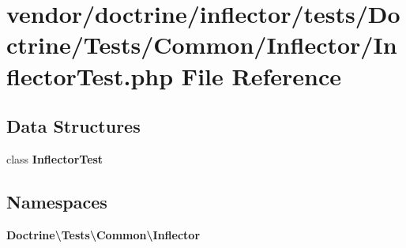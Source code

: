 \section{vendor/doctrine/inflector/tests/\+Doctrine/\+Tests/\+Common/\+Inflector/\+Inflector\+Test.php File Reference}
\label{_inflector_test_8php}
\subsection*{Data Structures}
\begin{DoxyCompactItemize}
\item 
class {\bf Inflector\+Test}
\end{DoxyCompactItemize}
\subsection*{Namespaces}
\begin{DoxyCompactItemize}
\item 
 {\bf Doctrine\textbackslash{}\+Tests\textbackslash{}\+Common\textbackslash{}\+Inflector}
\end{DoxyCompactItemize}
